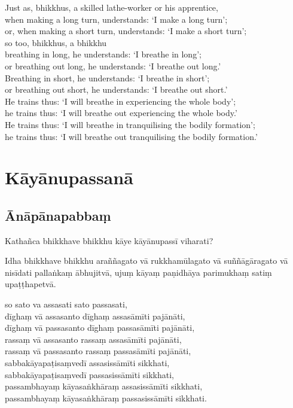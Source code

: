 Just as, bhikkhus, a skilled lathe-worker or his apprentice,\\
when making a long turn, understands: ‘I make a long turn’;\\
or, when making a short turn, understands: ‘I make a short turn’;\\
so too, bhikkhus, a bhikkhu\\
breathing in long, he understands: ‘I breathe in long’;\\
or breathing out long, he understands: ‘I breathe out long.’\\
Breathing in short, he understands: ‘I breathe in short’;\\
or breathing out short, he understands: ‘I breathe out short.’\\
He trains thus: ‘I will breathe in experiencing the whole body’;\\
he trains thus: ‘I will breathe out experiencing the whole body.’\\
He trains thus: ‘I will breathe in tranquilising the bodily formation’;\\
he trains thus: ‘I will breathe out tranquilising the bodily formation.’

\paliPage
\chapter*{Kāyānupassanā}

\section*{Ānāpānapabbaṃ}

Kathañca bhikkhave bhikkhu kāye kāyānupassī viharati?

Idha bhikkhave bhikkhu araññagato vā rukkhamūlagato vā suññāgāragato vā nisīdati
pallaṅkaṃ ābhujitvā, ujuṃ kāyaṃ paṇidhāya parimukhaṃ satiṃ upaṭṭhapetvā.

so sato va assasati sato passasati,\\
dīghaṃ vā assasanto dīghaṃ assasāmīti pajānāti,\\
dīghaṃ vā passasanto dīghaṃ passasāmīti pajānāti,\\
rassaṃ vā assasanto rassaṃ assasāmīti pajānāti,\\
rassaṃ vā passasanto rassaṃ passasāmīti pajānāti,\\
sabbakāyapaṭisaṃvedī assasissāmīti sikkhati,\\
sabbakāyapaṭisaṃvedī passasissāmīti sikkhati,\\
passambhayaṃ kāyasaṅkhāraṃ assasissāmīti sikkhati,\\
passambhayaṃ kāyasaṅkhāraṃ passasissāmīti sikkhati.

